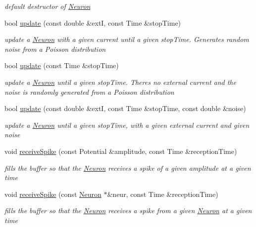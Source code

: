 \begin{DoxyCompactItemize}
\begin{DoxyCompactList}\small\item\em default destructor of \hyperlink{classNeuron}{Neuron} \end{DoxyCompactList}\item 
bool \hyperlink{classNeuron_a9692066fbcd0d632246970c627784341}{update} (const double \&extI, const Time \&stop\+Time)
\begin{DoxyCompactList}\small\item\em update a \hyperlink{classNeuron}{Neuron} with a given current until a given stop\+Time. Generates random noise from a Poisson distribution \end{DoxyCompactList}\item 
bool \hyperlink{classNeuron_ae2e3e2ebf571a295c2858ee48efbecce}{update} (const Time \&stop\+Time)
\begin{DoxyCompactList}\small\item\em update a \hyperlink{classNeuron}{Neuron} until a given stop\+Time. There\textquotesingle{}s no external current and the noise is randomly generated from a Poisson distribution \end{DoxyCompactList}\item 
bool \hyperlink{classNeuron_aa21dce996e08173d864c9f4b0198a793}{update} (const double \&extI, const Time \&stop\+Time, const double \&noise)
\begin{DoxyCompactList}\small\item\em update a \hyperlink{classNeuron}{Neuron} until a given stop\+Time, with a given external current and given noise \end{DoxyCompactList}\item 
void \hyperlink{classNeuron_a8e54b7a86764bd1445f8a8105c3ba5e2}{receive\+Spike} (const Potential \&amplitude, const Time \&reception\+Time)
\begin{DoxyCompactList}\small\item\em fills the buffer so that the \hyperlink{classNeuron}{Neuron} receives a spike of a given amplitude at a given time \end{DoxyCompactList}\item 
void \hyperlink{classNeuron_aa2fb0abb3108ee6cec39773d3f7a0761}{receive\+Spike} (const \hyperlink{classNeuron}{Neuron} $\ast$\&neur, const Time \&reception\+Time)
\begin{DoxyCompactList}\small\item\em fills the buffer so that the \hyperlink{classNeuron}{Neuron} receives a spike from a given \hyperlink{classNeuron}{Neuron} at a given time \end{DoxyCompactList}\item 

\end{DoxyCompactItemize}
